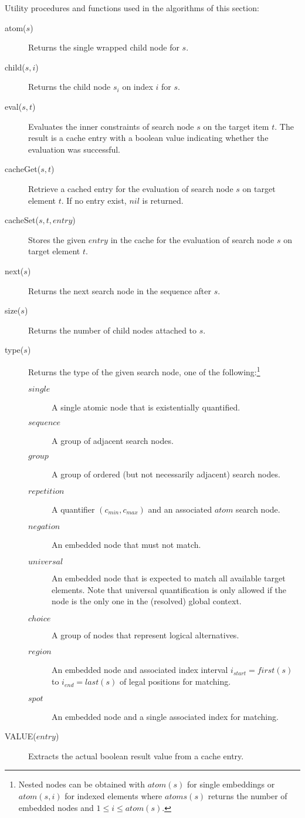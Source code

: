 \documentclass[11pt,a4paper]{report}
\begin{document}
Utility procedures and functions used in the algorithms of this section:
\begin{description}
	\item[atom($s$)] Returns the single wrapped child node for $s$. 
	\item[child($s, i$)] Returns the child node $s_i$ on index $i$ for $s$. 
	\item[eval($s,t$)] Evaluates the inner constraints of search node $s$ on the target item $t$. The result is a cache entry with a boolean value indicating whether the evaluation was successful.
	\item[cacheGet($s,t$)] Retrieve a cached entry for the evaluation of search node $s$ on target element $t$. If no entry exist, $nil$ is returned.
	\item[cacheSet($s, t, entry$)] Stores the given $entry$ in the cache for the evaluation of search node $s$ on target element $t$.  
	\item[next($s$)] Returns the next search node in the sequence after $s$.
	\item[size($s$)] Returns the number of child nodes attached to $s$.
	\item[type($s$)] Returns the type of the given search node, one of the following:\footnote{Nested nodes can be obtained with $atom(s)$ for single embeddings or $atom(s,i)$ for indexed elements where $atoms(s)$ returns the number of embedded nodes and $1 \leq i \leq atom(s)$.}
	\begin{description}
		\item[$single$] A single atomic node that is existentially quantified.
		\item[$sequence$] A group of adjacent search nodes.
		\item[$group$] A group of ordered (but not necessarily adjacent) search nodes. 
		\item[$repetition$] A quantifier $(c_{min},c_{max})$ and an associated $atom$ search node.
		\item[$negation$] An embedded node that must not match.
		\item[$universal$] An embedded node that is expected to match all available target elements. Note that universal quantification is only allowed if the node is the only one in the (resolved) global context.
		\item[$choice$] A group of nodes that represent logical alternatives.
		\item[$region$] An embedded node and associated index interval $i_{start} = first(s)$ to $i_{end}=last(s)$ of legal positions for matching.
		\item[$spot$] An embedded node and a single associated index for matching.
	\end{description}
\item[VALUE($entry$)] Extracts the actual boolean result value from a cache entry.
\end{description}
\end{document}
